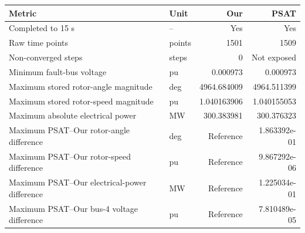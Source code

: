 \begin{tabular}{llrr}\toprule
Metric & Unit & Our & PSAT \\ \midrule
Completed to 15 s & -- & Yes & Yes \\
Raw time points & points & 1501 & 1509 \\
Non-converged steps & steps & 0 & {Not exposed} \\
Minimum fault-bus voltage & pu & 0.000973 & 0.000973 \\
Maximum stored rotor-angle magnitude & deg & 4964.684009 & 4964.511399 \\
Maximum stored rotor-speed magnitude & pu & 1.040163906 & 1.040155053 \\
Maximum absolute electrical power & MW & 300.383981 & 300.376323 \\ \midrule
Maximum PSAT--Our rotor-angle difference & deg & {Reference} & 1.863392e-01 \\
Maximum PSAT--Our rotor-speed difference & pu & {Reference} & 9.867292e-06 \\
Maximum PSAT--Our electrical-power difference & MW & {Reference} & 1.225034e-01 \\
Maximum PSAT--Our bus-4 voltage difference & pu & {Reference} & 7.810489e-05 \\
\bottomrule\end{tabular}
